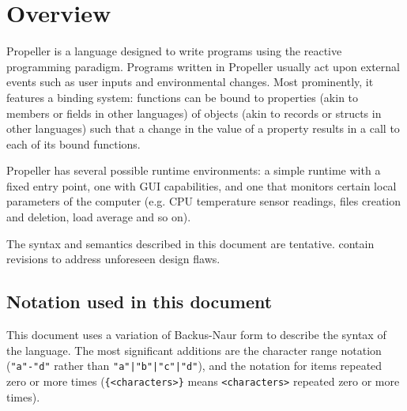 \section{Overview}

Propeller is a language designed to write programs using the reactive programming paradigm. Programs
written in Propeller usually act upon external events such as user inputs and environmental changes.
Most prominently, it features a binding system: functions can be bound to properties (akin to members
or fields in other languages) of objects (akin to records or structs in other languages) such that a
change in the value of a property results in a call to each of its bound functions.

Propeller has several possible runtime environments: a simple runtime with a fixed entry point, one
with GUI capabilities, and one that monitors certain local parameters of the computer (e.g. CPU
temperature sensor readings, files creation and deletion, load average and so on).

The syntax and semantics described in this document are tentative.
contain revisions to address unforeseen design flaws.

\subsection{Notation used in this document}

This document uses a variation of Backus-Naur form to describe the syntax of the language. The most
significant additions are the character range notation (\verb|"a"-"d"| rather than
\verb:"a"|"b"|"c"|"d":), and the notation for items repeated zero or more times (\verb|{<characters>}| means
\verb|<characters>| repeated zero or more times).

